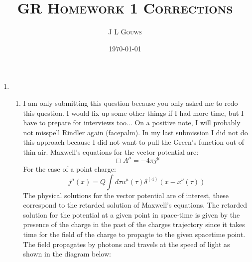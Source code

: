 \documentclass[12pt,a4]{article}
\title{
\textsc{GR Homework 1 Corrections}
}
\author{\textsc{J L Gouws}
}
\date{\today
\\[1cm]}
\begin{document}
\thispagestyle{empty}

\maketitle

\begin{enumerate}
  \item
    \begin{enumerate}
      \item
        I am only submitting this question because you only asked me to redo this question.
        I would fix up some other things if I had more time, but I have to prepare for interviews too...
        On a positive note, I will probably not misspell Rindler again (facepalm).
        In my last submission I did not do this approach because I did not want to pull the Green's function out of thin air.
        Maxwell's equations for the vector potential are:
        \begin{equation*}
          \Box A^\mu = - 4 \pi j^\mu
        \end{equation*}
        For the case of a point charge:
        \begin{equation*}
          j^\mu(x) = Q \int d\tau u^\mu(\tau) \delta^{(4)} (x - x^{\nu}(\tau))
        \end{equation*}
        The physical solutions for the vector potential are of interest, these correspond to the retarded solution of Maxwell's equations. 
        The retarded solution for the potential at a given point in space-time is given by the presence of the charge in the past of the charges trajectory since it takes time for the field of the charge to propagte to the given spacetime point.
        The field propagates by photons and travels at the speed of light as shown in the diagram below:

        \begin{figure}[H]
          \centering
        \end{figure}


\end{enumerate}
\end{enumerate}
\end{document}
